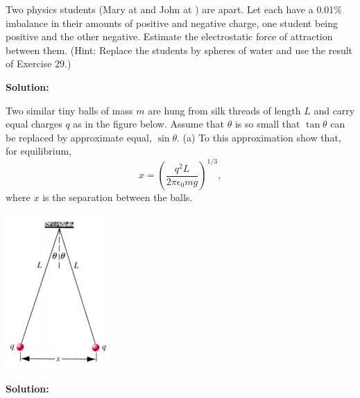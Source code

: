 \documentclass[11pt]{article}
\newcommand{\pn}[1]{\left( #1 \right)}
\begin{document}
\vspace*{0.25in}


\begin{problem}[E25.30]
Two physics students (Mary at  and John at ) are  apart. Let each have a 0.01\% imbalance in their
amounts of positive and negative charge, one student being positive and the other negative. Estimate the electrostatic force of attraction between them.
(Hint: Replace the students by spheres of water and use the result of Exercise 29.)
\end{problem}


\textbf{Solution:}


\clearpage
\begin{problem}[P25.4(a)*]
Two similar tiny balls of mass $m$ are hung from silk threads of length $L$ and carry equal charges $q$ as in the figure below. Assume that
$\theta$ is so small that $\tan\theta$ can be replaced by approximate equal, $\sin\theta$. (a) To this approximation show that, for equilibrium,
$$
	x = \pn{\frac{q^2L}{2\pi\epsilon_0mg}}^{1/3},
$$
where $x$ is the separation between the balls.
\begin{center}
\includegraphics[scale=0.6]{prob2.png}
\end{center}
\end{problem}


\textbf{Solution:}

\end{document}
